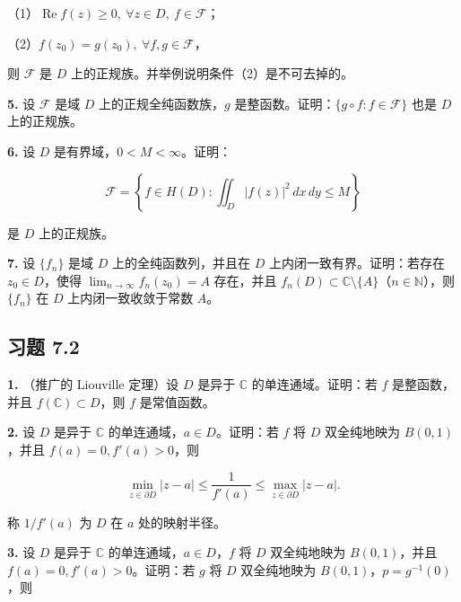 \documentclass[11pt,a4paper]{article}
\begin{document}
（1）\(\operatorname{Re}f(z)\ge0,\ \forall z\in D,\ f\in\mathcal F\)；

（2）\(f(z_0)=g(z_0),\ \forall f,g\in\mathcal F\)，

则 \(\mathcal F\) 是 \(D\) 上的正规族。并举例说明条件（2）是不可去掉的。

\par{}
\noindent\textbf{5.} 设 \(\mathcal F\) 是域 \(D\) 上的正规全纯函数族，\(g\)
是整函数。证明：\(\{g\circ f:f\in\mathcal F\}\) 也是 \(D\) 上的正规族。

\par{}
\noindent\textbf{6.} 设 \(D\) 是有界域，\(0<M<\infty\)。证明：

\[
\mathcal F=\left\{f\in H(D):\iint_D|f(z)|^2\,dx\,dy\le M\right\}
\]

是 \(D\) 上的正规族。

\par{}
\noindent\textbf{7.} 设 \(\{f_n\}\) 是域 \(D\) 上的全纯函数列，并且在 \(D\)
上内闭一致有界。证明：若存在 \(z_0\in D\)，使得
\(\lim_{n\to\infty}f_n(z_0)=A\) 存在，并且
\(f_n(D)\subset\mathbb C\setminus\{A\}\)（\(n\in\mathbb N\)），则
\(\{f_n\}\) 在 \(D\) 上内闭一致收敛于常数 \(A\)。

\subsection{习题 7.2}\label{ch07-practice-heading-3}

\par{}
\noindent\textbf{1.} （推广的 Liouville 定理）设 \(D\) 是异于 \(\mathbb C\)
的单连通域。证明：若 \(f\) 是整函数，并且 \(f(\mathbb C)\subset D\)，则
\(f\) 是常值函数。

\par{}
\noindent\textbf{2.} 设 \(D\) 是异于 \(\mathbb C\)
的单连通域，\(a\in D\)。证明：若 \(f\) 将 \(D\) 双全纯地映为
\(B(0,1)\)，并且 \(f(a)=0,f'(a)>0\)，则

\[
\min_{z\in\partial D}|z-a|\le\frac1{f'(a)}\le\max_{z\in\partial D}|z-a|.
\]

称 \(1/f'(a)\) 为 \(D\) 在 \(a\) 处的映射半径。

\par{}
\noindent\textbf{3.} 设 \(D\) 是异于 \(\mathbb C\) 的单连通域，\(a\in D\)，\(f\)
将 \(D\) 双全纯地映为 \(B(0,1)\)，并且 \(f(a)=0,f'(a)>0\)。证明：若
\(g\) 将 \(D\) 双全纯地映为 \(B(0,1)\)，\(p=g^{-1}(0)\)，则
\end{document}
